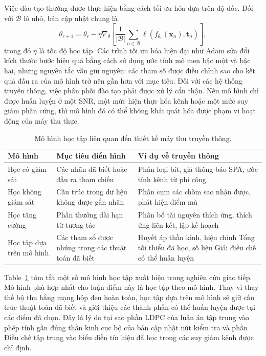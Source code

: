 Việc đào tạo thường được thực hiện bằng cách tối ưu hóa dựa trên độ dốc. Đối với $\mathcal{B}$ lô nhỏ, bản cập nhật chung là
\begin{equation}
\label{eq:gradient_update_ch1}
\theta_{r+1}=\theta_r-\eta\nabla_{\theta}
\left[\frac{1}{|\mathcal{B}|}\sum_{n\in\mathcal{B}}
\ell\!\left(f_{\theta_r}(\mathbf{x}_n),\mathbf{t}_n\right)\right],
\end{equation}
trong đó $\eta$ là tốc độ học tập. Các trình tối ưu hóa hiện đại như Adam sửa đổi kích thước bước hiệu quả bằng cách sử dụng ước tính mô men bậc một và bậc hai, nhưng nguyên tắc vẫn giữ nguyên: các tham số được điều chỉnh sao cho kết quả đầu ra của mô hình trở nên gần hơn với mục tiêu. Đối với các hệ thống truyền thông, việc phân phối đào tạo phải được xử lý cẩn thận. Nếu mô hình chỉ được huấn luyện ở một SNR, một mức hiện thực hóa kênh hoặc một mức suy giảm phần cứng, thì mô hình đó có thể không khái quát hóa được phạm vi hoạt động của máy thu thực.

\begin{table}[H]
\centering
\caption{Mô hình học tập liên quan đến thiết kế máy thu truyền thông.}
\label{tab:learning_paradigms}
\begin{tabularx}{\textwidth}{>{\raggedright\arraybackslash}p{}>{\raggedright\arraybackslash}p{}>{\raggedright\arraybackslash}X}
\toprule
Mô hình & Mục tiêu điển hình & Ví dụ về truyền thông\\
\midrule
Học có giám sát & Các nhãn đã biết hoặc đầu ra tham chiếu & Phân loại bit, giả thông báo SPA, ước tính kênh từ phi công\\
Học không giám sát & Cấu trúc trong dữ liệu không được gắn nhãn & Phân cụm các chòm sao nhận được, phát hiện điểm mù\\
Học tăng cường & Phần thưởng dài hạn từ tương tác & Phân bổ tài nguyên thích ứng, thích ứng liên kết, lập kế hoạch\\
Học tập dựa trên mô hình & Các tham số được nhúng trong các thuật toán đã biết & Huyết áp thần kinh, hiệu chỉnh Tổng tối thiểu đã học, số liệu Giải điều chế có thể huấn luyện\\
\bottomrule
\end{tabularx}
\end{table}

Table~\ref{tab:learning_paradigms} tóm tắt một số mô hình học tập xuất hiện trong nghiên cứu giao tiếp. Mô hình phù hợp nhất cho luận điểm này là học tập theo mô hình. Thay vì thay thế bộ thu bằng mạng hộp đen hoàn toàn, học tập dựa trên mô hình sẽ giữ cấu trúc thuật toán đã biết và giới thiệu các thành phần có thể huấn luyện được tại các điểm đã chọn. Đây là lý do tại sao phần LDPC của luận án tập trung vào phép tính gần đúng thần kinh cục bộ của bản cập nhật nút kiểm tra và phần Điều chế tập trung vào biểu diễn tín hiệu đã học trong các suy giảm kênh được chỉ định.


